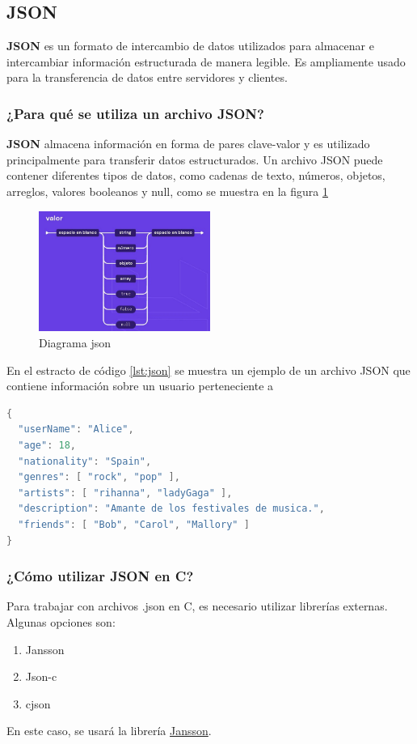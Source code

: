 \subsection{JSON}
\textbf{JSON} es un formato de intercambio de datos utilizados para almacenar e intercambiar información estructurada de manera legible. Es ampliamente usado para la transferencia de datos entre servidores y clientes.
\subsubsection*{¿Para qué se utiliza un archivo JSON?} %
\textbf{JSON} almacena información en forma de pares clave-valor y es utilizado principalmente para transferir datos estructurados. Un archivo JSON puede contener diferentes tipos de datos, como cadenas de texto, números, objetos, arreglos, valores booleanos y null, como se muestra en la figura \ref{fig:json}
\begin{figure}[H]
    \centering %
    \includegraphics[width=0.5\textwidth]{./src/images/json.png} %
    \caption{Diagrama json} %
    \label{fig:json} %
\end{figure}
En el estracto de código \ref{lst:json} se muestra un ejemplo de un archivo JSON que contiene información sobre un usuario perteneciente a \loopweb
\begin{lstlisting}[language=C, caption={Ejemplo de .json}, label={lst:json}]
{
  "userName": "Alice",
  "age": 18,
  "nationality": "Spain",
  "genres": [ "rock", "pop" ],
  "artists": [ "rihanna", "ladyGaga" ],
  "description": "Amante de los festivales de musica.",
  "friends": [ "Bob", "Carol", "Mallory" ]
}
\end{lstlisting}

\newpage
\subsubsection*{¿Cómo utilizar JSON en C?}
Para trabajar con archivos .json en C, es necesario utilizar librerías externas. Algunas opciones son:
\begin{enumerate}
    \item Jansson
    \item Json-c
    \item cjson
\end{enumerate}
En este caso, se usará la librería \href{https://github.com/akheron/jansson}{Jansson}.


